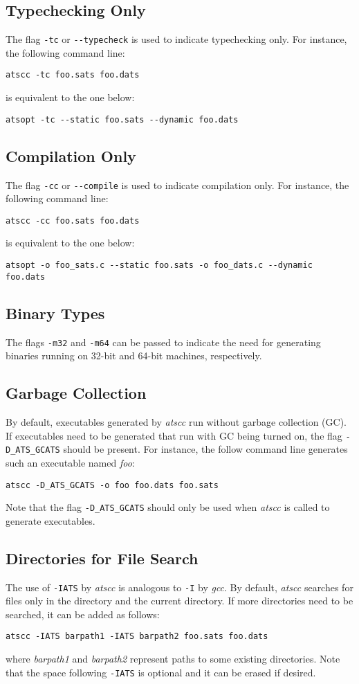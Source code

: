 \subsection{Typechecking Only}
The flag \verb`-tc` or \verb`--typecheck` is used to indicate typechecking
only. For instance, the following command line:
\begin{verbatim}
atscc -tc foo.sats foo.dats
\end{verbatim}
is equivalent to the one below:
\begin{verbatim}
atsopt -tc --static foo.sats --dynamic foo.dats
\end{verbatim}

\subsection{Compilation Only}
The flag \verb`-cc` or \verb`--compile` is used to indicate compilation only.
For instance, the following command line:
\begin{verbatim}
atscc -cc foo.sats foo.dats
\end{verbatim}
is equivalent to the one below:
\begin{verbatim}
atsopt -o foo_sats.c --static foo.sats -o foo_dats.c --dynamic foo.dats
\end{verbatim}

\subsection{Binary Types}
The flags \verb`-m32` and \verb`-m64` can be passed to indicate the need
for generating binaries running on 32-bit and 64-bit machines, respectively.

\subsection{Garbage Collection}
By default, executables generated by {\it atscc} run without garbage
collection (GC). If executables need to be generated that run with GC being
turned on, the flag \verb`-D_ATS_GCATS` should be present.  For instance,
the follow command line generates such an executable named {\it foo}:
\begin{verbatim}
atscc -D_ATS_GCATS -o foo foo.dats foo.sats
\end{verbatim}
Note that the flag \verb`-D_ATS_GCATS` should only be used when {\it atscc}
is called to generate executables.

\subsection{Directories for File Search}
The use of \verb`-IATS` by {\it atscc} is analogous to \verb`-I` by {\it gcc}.
By default, {\it atscc} searches for files only in the directory {\ATSHOME}
and the current directory. If more directories need to be searched, it can
be added as follows:
\begin{verbatim}
atscc -IATS barpath1 -IATS barpath2 foo.sats foo.dats
\end{verbatim}
where {\it barpath1} and {\it barpath2} represent paths to some existing directories.
Note that the space following \verb`-IATS` is optional and it can be erased
if desired.

